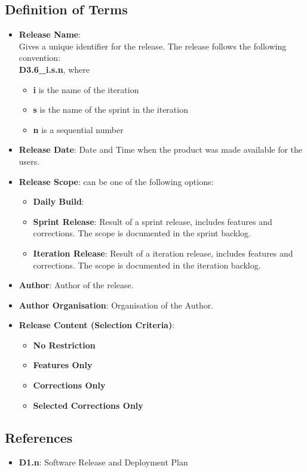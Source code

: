 \documentclass{template/openetcs_article}
\begin{document}
\subsection{Definition of Terms}
\begin{itemize}
\item \textbf{Release Name}:\\
Gives a unique identifier for the release. The release follows the following convention:\\
\textbf{D3.6\_i.s.n}, where
\begin{itemize}
\item \textbf{i} is the name of the iteration
\item \textbf{s} is the name of the sprint in the iteration
\item \textbf{n} is a sequential number
\end{itemize}
\item \textbf{Release Date}: Date and Time when the product was made available for the users.
\item \textbf{Release Scope}: can be one of the following options:
\begin{itemize}
\item \textbf{Daily Build}:
\item \textbf{Sprint Release}: Result of a sprint release, includes features and corrections. The scope is documented in the sprint backlog.
\item \textbf{Iteration Release}: Result of a iteration release, includes features and corrections. The scope is documented in the iteration backlog.
\end{itemize}

\item \textbf{Author}: Author of the release.
\item \textbf{Author Organisation}: Organisation of the Author.
\item \textbf{Release Content (Selection Criteria)}: 
\begin{itemize}
\item \textbf{No Restriction}
\item \textbf{Features Only}
\item \textbf{Corrections Only}
\item \textbf{Selected Corrections Only}
\end{itemize}
\end{itemize}

\subsection{References}
\begin{itemize}
\item \textbf{D1.n}: Software Release and Deployment Plan
\end{itemize}





\end{document}
